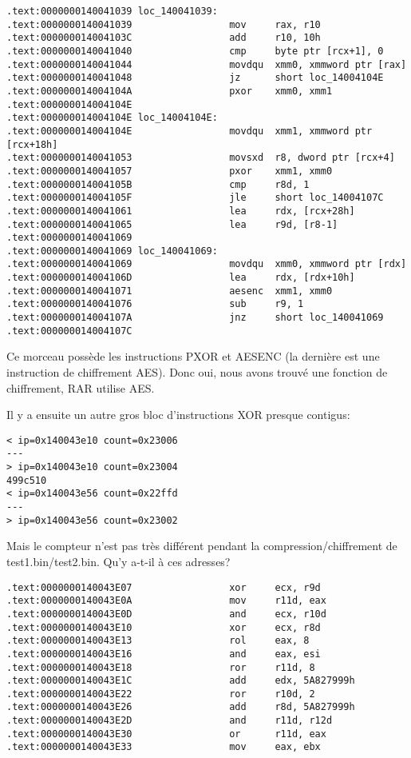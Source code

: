 \begin{lstlisting}
.text:0000000140041039 loc_140041039:
.text:0000000140041039                 mov     rax, r10
.text:000000014004103C                 add     r10, 10h
.text:0000000140041040                 cmp     byte ptr [rcx+1], 0
.text:0000000140041044                 movdqu  xmm0, xmmword ptr [rax]
.text:0000000140041048                 jz      short loc_14004104E
.text:000000014004104A                 pxor    xmm0, xmm1
.text:000000014004104E
.text:000000014004104E loc_14004104E:
.text:000000014004104E                 movdqu  xmm1, xmmword ptr [rcx+18h]
.text:0000000140041053                 movsxd  r8, dword ptr [rcx+4]
.text:0000000140041057                 pxor    xmm1, xmm0
.text:000000014004105B                 cmp     r8d, 1
.text:000000014004105F                 jle     short loc_14004107C
.text:0000000140041061                 lea     rdx, [rcx+28h]
.text:0000000140041065                 lea     r9d, [r8-1]
.text:0000000140041069
.text:0000000140041069 loc_140041069:
.text:0000000140041069                 movdqu  xmm0, xmmword ptr [rdx]
.text:000000014004106D                 lea     rdx, [rdx+10h]
.text:0000000140041071                 aesenc  xmm1, xmm0
.text:0000000140041076                 sub     r9, 1
.text:000000014004107A                 jnz     short loc_140041069
.text:000000014004107C
\end{lstlisting}

Ce morceau possède les instructions PXOR et AESENC (la dernière est une instruction
de chiffrement \ac{AES}).
Donc oui, nous avons trouvé une fonction de chiffrement, RAR utilise \ac{AES}.

Il y a ensuite un autre gros bloc d'instructions XOR presque contigus:

\begin{lstlisting}
< ip=0x140043e10 count=0x23006
---
> ip=0x140043e10 count=0x23004
499c510
< ip=0x140043e56 count=0x22ffd
---
> ip=0x140043e56 count=0x23002
\end{lstlisting}

Mais le compteur n'est pas très différent pendant la compression/chiffrement de test1.bin/test2.bin.
Qu'y a-t-il à ces adresses?

\begin{lstlisting}
.text:0000000140043E07                 xor     ecx, r9d
.text:0000000140043E0A                 mov     r11d, eax
.text:0000000140043E0D                 and     ecx, r10d
.text:0000000140043E10                 xor     ecx, r8d
.text:0000000140043E13                 rol     eax, 8
.text:0000000140043E16                 and     eax, esi
.text:0000000140043E18                 ror     r11d, 8
.text:0000000140043E1C                 add     edx, 5A827999h
.text:0000000140043E22                 ror     r10d, 2
.text:0000000140043E26                 add     r8d, 5A827999h
.text:0000000140043E2D                 and     r11d, r12d
.text:0000000140043E30                 or      r11d, eax
.text:0000000140043E33                 mov     eax, ebx
\end{lstlisting}

